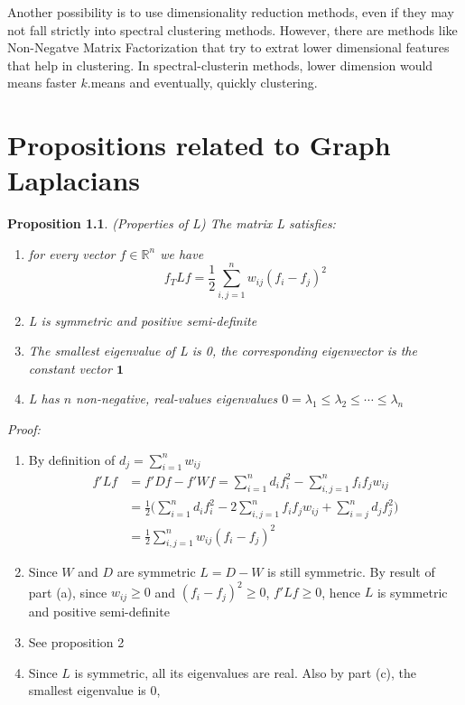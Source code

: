 \documentclass[10pt,a4paper, nocenter]{report}
\newtheorem{prop}{Proposition}
\begin{document}
    Another possibility is to use dimensionality reduction methods, even if they may not fall strictly into spectral clustering methods. However, there are methods like Non-Negatve Matrix Factorization that try to extrat lower dimensional features that help in clustering. In spectral-clusterin methods, lower dimension would means faster $k$.means and eventually, quickly clustering.


    \appendix
    \chapter{Propositions related to Graph Laplacians}
    \begin{prop}(Properties of L) The matrix L satisfies:
        \begin{enumerate}
            \item for every vector $f \in \mathbb{R}^{n}$ we have $$ f_{T}Lf = \frac{1}{2}\sum_{i,j=1}^{n} w_{ij}(f_{i}-f_{j})^{2} $$
            \item L is symmetric and positive semi-definite
            \item The smallest eigenvalue of L is 0, the corresponding eigenvector is the constant vector $\mathbf{1}$
            \item L has $n$ non-negative, real-values eigenvalues $0=\lambda_{1} \le \lambda_{2} \le \cdots \le \lambda_{n}$
        \end{enumerate}
    \end{prop}
    \textit{Proof:}
    \begin{enumerate}
        \item  By definition of $d_{j} = \sum_{i=1}^{n}w_{ij}$
        \begin{align*}
        f'Lf & = f'Df - f'Wf = \sum_{i=1}^{n}d_{i}f_{i}^{2} -  \sum_{i,j=1}^{n}f_{i}f_{j}w_{ij}\\
        & = \frac{1}{2}\bigg(\sum_{i=1}^{n}d_{i}f_{i}^{2} -  2\sum_{i,j=1}^{n}f_{i}f_{j}w_{ij} + \sum_{i=j}^{n}d_{j}f_{j}^{2}\bigg)\\
        & = \frac{1}{2}\sum_{i,j=1}^{n}w_{ij}(f_{i}-f_{j})^{2}
        \end{align*}
        \item Since $W$ and $D$ are symmetric $L = D-W$ is still symmetric. By result of part (a), since $w_{ij} \ge 0$ and $(f_{i}-f_{j})^{2} \ge 0$, $f'Lf \ge 0$, hence $L$ is symmetric and positive semi-definite
        \item See proposition 2
        \item Since $L$ is symmetric, all its eigenvalues are real. Also by part (c), the smallest eigenvalue is 0, 
    \end{enumerate}
\end{document}

